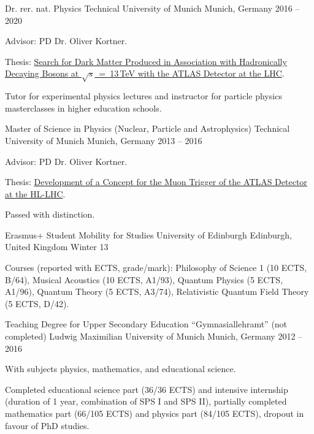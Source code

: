 \documentclass[11pt, letterpaper, draft]{academic-cv}
\begin{document}
\begin{cventries}
	  \cventry
	  {Dr. rer. nat. Physics} %
	  {Technical University of Munich} %
	  {Munich, Germany} %
	  {2016 -- 2020} %
	  {
		\begin{cvitems} %
		  \item {Advisor: PD Dr. Oliver Kortner.}
		  \item {Thesis: \href{https://cds.cern.ch/record/2744557}{Search for Dark Matter Produced in Association with Hadronically Decaying Bosons at \(\sqrt{s}\)~=~13\,TeV with the ATLAS Detector at the LHC}.}
		  \item {Tutor for experimental physics lectures and instructor for particle physics masterclasses in higher education schools.}
		\end{cvitems}
	  }
  
	\cventry
	  {Master of Science in Physics (Nuclear, Particle and Astrophysics)} %
	  {Technical University of Munich} %
	  {Munich, Germany} %
	  {2013 -- 2016} %
	  {
		\begin{cvitems} %
		  \item {Advisor: PD Dr. Oliver Kortner.}
		  \item {Thesis: \href{https://cds.cern.ch/record/2162398}{Development of a Concept for the Muon Trigger of the ATLAS Detector at the HL-LHC}.}
		  \item {Passed with distinction.}
		\end{cvitems}
	  }
  
	  \cventry
	  {Erasmus+ Student Mobility for Studies} %
	  {University of Edinburgh} %
	  {Edinburgh, United Kingdom} %
	  {Winter 13} %
	  {
		\begin{cvitems} %
		  \item {Courses (reported with ECTS, grade/mark): Philosophy of Science 1 (10 ECTS, B/64), Musical Acoustics (10 ECTS, A1/93), Quantum Physics (5 ECTS, A1/96), Quantum Theory (5 ECTS, A3/74), Relativistic Quantum Field Theory (5 ECTS, D/42).}
		\end{cvitems}
	  }
  
	  \cventry
	  {Teaching Degree for Upper Secondary Education “Gymnasiallehramt” (not completed)} %
	  {Ludwig Maximilian University of Munich} %
	  {Munich, Germany} %
	  {2012 -- 2016} %
	  {
		\begin{cvitems} %
		  \item {With subjects physics, mathematics, and educational science.}
		  \item {Completed educational science part (36/36 ECTS) and in­ten­si­ve in­ternship (duration of 1 year, com­bi­na­ti­on of SPS I and SPS II), partially completed mathematics part (66/105 ECTS) and physics part (84/105 ECTS), dropout in favour of PhD studies.}
		\end{cvitems}
	  }
  

\end{cventries}
\end{document}
